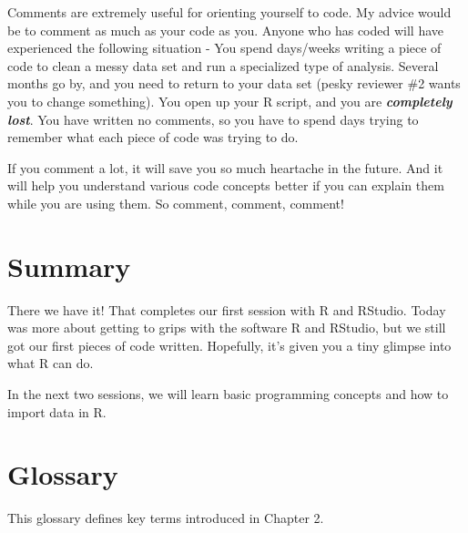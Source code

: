 \documentclass[
]{book}
\begin{document}
Comments are extremely useful for orienting yourself to code. My advice would be to comment as much as your code as you. Anyone who has coded will have experienced the following situation - You spend days/weeks writing a piece of code to clean a messy data set and run a specialized type of analysis. Several months go by, and you need to return to your data set (pesky reviewer \#2 wants you to change something). You open up your R script, and you are \textbf{\emph{completely lost}}. You have written no comments, so you have to spend days trying to remember what each piece of code was trying to do.

If you comment a lot, it will save you so much heartache in the future. And it will help you understand various code concepts better if you can explain them while you are using them. So comment, comment, comment!

\hypertarget{summary}{%
\section{Summary}\label{summary}}

There we have it! That completes our first session with R and RStudio. Today was more about getting to grips with the software R and RStudio, but we still got our first pieces of code written. Hopefully, it's given you a tiny glimpse into what R can do.

In the next two sessions, we will learn basic programming concepts and how to import data in R.

\hypertarget{glossary}{%
\section{Glossary}\label{glossary}}

This glossary defines key terms introduced in Chapter 2.
\end{document}
